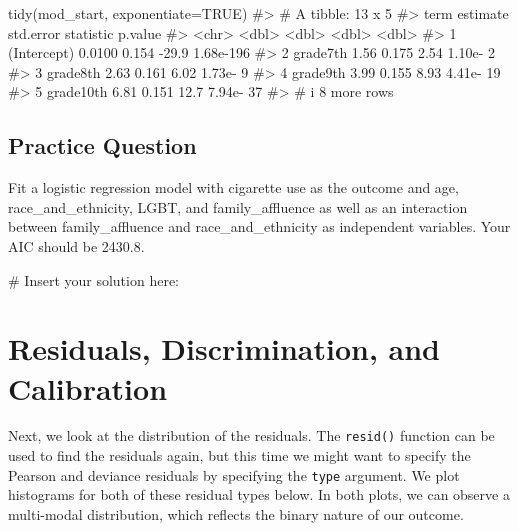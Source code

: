 \documentclass[
  letterpaper,
]{krantz}
\makeatletter
\newenvironment{Shaded}{\begin{snugshade}}{\end{snugshade}}
\newcommand{\AttributeTok}[1]{\textcolor[rgb]{0.40,0.45,0.13}{#1}}
\newcommand{\CommentTok}[1]{\textcolor[rgb]{0.37,0.37,0.37}{#1}}
\newcommand{\ConstantTok}[1]{\textcolor[rgb]{0.56,0.35,0.01}{#1}}
\newcommand{\FunctionTok}[1]{\textcolor[rgb]{0.28,0.35,0.67}{#1}}
\newcommand{\NormalTok}[1]{\textcolor[rgb]{0.00,0.23,0.31}{#1}}
\newenvironment{kframe}{%
\medskip{}
\setlength{\fboxsep}{.8em}
 \def\at@end@of@kframe{}%
 \ifinner\ifhmode%
  \def\at@end@of@kframe{\end{minipage}}%
  \begin{minipage}{\columnwidth}%
 \fi\fi%
 \def\FrameCommand##1{\hskip\@totalleftmargin \hskip-\fboxsep
 \colorbox{shadecolor}{##1}\hskip-\fboxsep
     \hskip-\linewidth \hskip-\@totalleftmargin \hskip\columnwidth}%
 \MakeFramed {\advance\hsize-\width
   \@totalleftmargin\z@ \linewidth\hsize
   \@setminipage}}%
 {\par\unskip\endMakeFramed%
 \at@end@of@kframe}
\renewenvironment{Shaded}{\begin{kframe}}{\end{kframe}}
\makeatother
\begin{document}
\begin{Shaded}
\begin{Highlighting}[]
\FunctionTok{tidy}\NormalTok{(mod\_start, }\AttributeTok{exponentiate=}\ConstantTok{TRUE}\NormalTok{)}
\CommentTok{\#\textgreater{} \# A tibble: 13 x 5}
\CommentTok{\#\textgreater{}   term        estimate std.error statistic   p.value}
\CommentTok{\#\textgreater{}   \textless{}chr\textgreater{}          \textless{}dbl\textgreater{}     \textless{}dbl\textgreater{}     \textless{}dbl\textgreater{}     \textless{}dbl\textgreater{}}
\CommentTok{\#\textgreater{} 1 (Intercept)   0.0100     0.154    {-}29.9  1.68e{-}196}
\CommentTok{\#\textgreater{} 2 grade7th      1.56       0.175      2.54 1.10e{-}  2}
\CommentTok{\#\textgreater{} 3 grade8th      2.63       0.161      6.02 1.73e{-}  9}
\CommentTok{\#\textgreater{} 4 grade9th      3.99       0.155      8.93 4.41e{-} 19}
\CommentTok{\#\textgreater{} 5 grade10th     6.81       0.151     12.7  7.94e{-} 37}
\CommentTok{\#\textgreater{} \# i 8 more rows}
\end{Highlighting}
\end{Shaded}

\hypertarget{practice-question-23}{%
\subsection{Practice Question}\label{practice-question-23}}

Fit a logistic regression model with cigarette use as the outcome and
age, race\_and\_ethnicity, LGBT, and family\_affluence as well as an
interaction between family\_affluence and race\_and\_ethnicity as
independent variables. Your AIC should be 2430.8.

\begin{Shaded}
\begin{Highlighting}[]
\CommentTok{\# Insert your solution here:}
\end{Highlighting}
\end{Shaded}

\hypertarget{residuals-discrimination-and-calibration}{%
\section{Residuals, Discrimination, and
Calibration}\label{residuals-discrimination-and-calibration}}

Next, we look at the distribution of the residuals. The \texttt{resid()}
function can be used to find the residuals again, but this time we might
want to specify the Pearson and deviance residuals by specifying the
\texttt{type} argument. We plot histograms for both of these residual
types below. In both plots, we can observe a multi-modal distribution,
which reflects the binary nature of our outcome.
\end{document}
